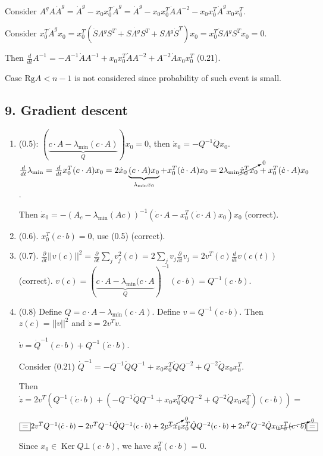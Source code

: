 \documentclass[a4paper]{article}
\DeclareMathOperator{\Ker}{Ker}
\begin{document}
Consider $A^gA\dot{A}^g=\dot{A}^g-x_0x_0^T\dot{A}^g=\dot{A}^g-x_0x_0^T\dot{A}A^{-2}-x_0x_0^T\dot{A}^gx_0x_0^T$.

Consider $x_0^T\dot{A}^gx_0=x_0^T(\dot{S}\Lambda^gS^T+S\dot{\Lambda^g}S^T+S\Lambda^g\dot{S}^T)x_0=x_0^T\dot{S}\Lambda^gS^Tx_0=0$.

Then $\frac{d}{dt}A^{-1}=-A^{-1}\dot{A}A^{-1}+x_0x_0^T\dot{A}A^{-2}+A^{-2}\dot{A}x_0x_0^T$ (0.21).

Case $\mbox{Rg}A<n-1$ is not considered since probability of such event is small.
\subsection*{9. Gradient descent}
\begin{enumerate}
\item (0.5): $(\underbrace{c\cdot A-\lambda_{\min}(c\cdot A)}_Q)x_0=0$, then $\dot{x}_0=-Q^{-1}\dot{Q}x_0$. $\frac{d}{dt}\lambda_{\min}=\frac{d}{dt}x_0^T(c\cdot A)x_0=2\dot{x}_0\underbrace{(c\cdot A)x_0}_{\lambda_{\min}x_0}+x_0^T(\dot{c}\cdot A)x_0=2\lambda_{\min}\cancelto{0}{\dot{x}_0^Tx_0}+x_0^T(\dot{c}\cdot A)x_0$.

Then $\dot{x}_0=-(A_c-\lambda_{\min}(Ac))^{-1}(\dot{c}\cdot A-x_0^T(\dot{c}\cdot A)x_0)x_0$ (correct).
\item (0.6). $x_0^T(c\cdot b)=0$, use (0.5) (correct).
\item (0.7). $\frac{\partial}{\partial t}||v(c)||^2=\frac{\partial}{\partial t}\sum\limits_j v_j^2(c)=2\sum\limits_j v_j\frac{\partial}{\partial t}v_j=2v^T(c)\frac{d}{dt} v(c(t))$ (correct). $v(c)=(\underbrace{c\cdot A-\lambda_{\min}(c\cdot A}_Q)^{-1}(c\cdot b)=Q^{-1}(c\cdot b)$.
\item (0.8) Define $Q=c\cdot A-\lambda_{\min}(c\cdot A)$. Define $v=Q^{-1}(c\cdot b)$. Then $z(c)=||v||^2$ and $\dot{z}=2v^T\dot{v}$.

$\dot{v}=\dot{Q}^{-1}(c\cdot b)+Q^{-1}(\dot{c}\cdot b)$.

Consider (0.21) $\dot{Q}^{-1}=-Q^{-1}\dot{Q}Q^{-1}+x_0x_0^T\dot{Q}Q^{-2}+Q^{-2}\dot{Q}x_0x_0^T$.

Then $\dot{z}=2v^T\left(Q^{-1}(\dot{c}\cdot b)+(-Q^{-1}\dot{Q}Q^{-1}+x_0x_0^T\dot{Q}Q^{-2}+Q^{-2}\dot{Q}x_0x_0^T)(c\cdot b)\right)\boxed{=}$

$\boxed{=}2v^TQ^{-1}(\dot{c}\cdot b)-2v^TQ^{-1}\dot{Q}Q^{-1}(c\cdot b)+2\cancelto{0}{v^Tx_0}x_0^T\dot{Q}Q^{-2}(c\cdot b)+2v^TQ^{-2}\dot{Q}x_0\cancelto{0}{x_0^T(c\cdot b)}\boxed{=}$

Since $x_0\in \Ker Q\bot (c\cdot b)$, we have $x_0^T(c\cdot b)=0$.


\end{enumerate}
\end{document}
